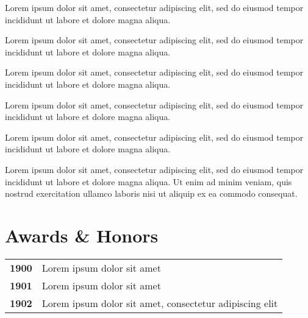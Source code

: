 \documentclass[]{deedy-resume-openfont}
\begin{document}
\begin{minipage}[t]{0.62\textwidth}
    \vspace{-\topsep} %
    \justifying \noindent \begin{tightemize}
        \item Lorem ipsum dolor sit amet, consectetur adipiscing elit, sed do eiusmod tempor incididunt ut labore et dolore magna aliqua.
        \item Lorem ipsum dolor sit amet, consectetur adipiscing elit, sed do eiusmod tempor incididunt ut labore et dolore magna aliqua.
        \item Lorem ipsum dolor sit amet, consectetur adipiscing elit, sed do eiusmod tempor incididunt ut labore et dolore magna aliqua.
    \end{tightemize}
    \sectionsep

    \noindent {}
    \vspace{-\topsep} %
    \justifying \noindent \begin{tightemize}
        \item Lorem ipsum dolor sit amet, consectetur adipiscing elit, sed do eiusmod tempor incididunt ut labore et dolore magna aliqua.
        \item Lorem ipsum dolor sit amet, consectetur adipiscing elit, sed do eiusmod tempor incididunt ut labore et dolore magna aliqua.
        \item Lorem ipsum dolor sit amet, consectetur adipiscing elit, sed do eiusmod tempor incididunt ut labore et dolore magna aliqua. Ut enim ad minim veniam, quis nostrud exercitation ullamco laboris nisi ut aliquip ex ea commodo consequat.
    \end{tightemize}
    \sectionsep


    \section{Awards \& Honors}

    \begin{tabular}{rl}
        \textbf{1900} & Lorem ipsum dolor sit amet\\
        \textbf{1901} & Lorem ipsum dolor sit amet\\
        \textbf{1902} & Lorem ipsum dolor sit amet, consectetur adipiscing elit
    \end{tabular}

\end{minipage}
\end{document}
